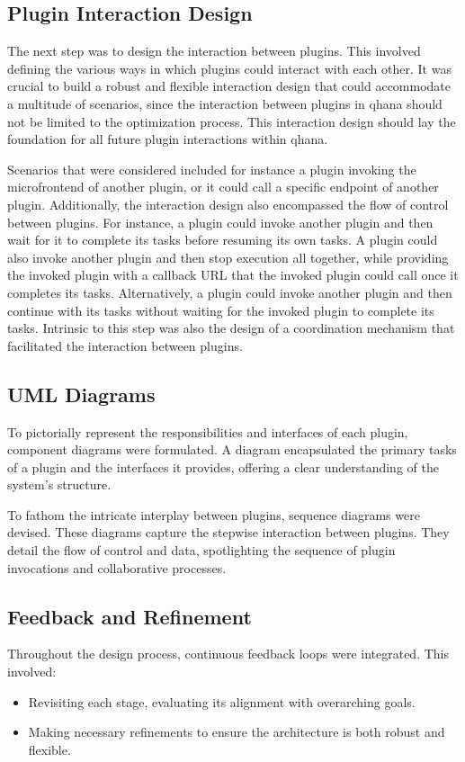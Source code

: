 \documentclass[
  a4paper,  %
  twoside,  %
  bibliography=totoc,
  headsepline,
  cleardoublepage=empty,
  parskip=half,
  draft=false
]{scrbook}
\begin{document}
\subsection{Plugin Interaction Design}
The next step was to design the interaction between plugins.
This involved defining the various ways in which plugins could interact with each other.
It was crucial to build a robust and flexible interaction design that could accommodate a multitude of scenarios, since the interaction between plugins in \gls{qhana} should not be limited to the optimization process.
This interaction design should lay the foundation for all future plugin interactions within \gls{qhana}.

Scenarios that were considered included for instance a plugin invoking the microfrontend of another plugin, or it could call a specific endpoint of another plugin.
Additionally, the interaction design also encompassed the flow of control between plugins.
For instance, a plugin could invoke another plugin and then wait for it to complete its tasks before resuming its own tasks.
A plugin could also invoke another plugin and then stop execution all together, while providing the invoked plugin with a callback URL that the invoked plugin could call once it completes its tasks.
Alternatively, a plugin could invoke another plugin and then continue with its tasks without waiting for the invoked plugin to complete its tasks.
Intrinsic to this step was also the design of a coordination mechanism that facilitated the interaction between plugins.

\subsection{UML Diagrams}
To pictorially represent the responsibilities and interfaces of each plugin, component diagrams were formulated.
A diagram encapsulated the primary tasks of a plugin and the interfaces it provides, offering a clear understanding of the system's structure.

To fathom the intricate interplay between plugins, sequence diagrams were devised.
These diagrams capture the stepwise interaction between plugins.
They detail the flow of control and data, spotlighting the sequence of plugin invocations and collaborative processes.


\subsection{Feedback and Refinement}
Throughout the design process, continuous feedback loops were integrated. This involved:
\begin{itemize}
\item Revisiting each stage, evaluating its alignment with overarching goals.
\item Making necessary refinements to ensure the architecture is both robust and flexible.
\end{itemize}
\end{document}
